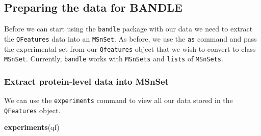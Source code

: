 \documentclass[9pt,a4paper,]{extarticle}
\newenvironment{Shaded}{\begin{snugshade}}{\end{snugshade}}
\newcommand{\FunctionTok}[1]{\textcolor[rgb]{0.13,0.29,0.53}{\textbf{#1}}}
\newcommand{\NormalTok}[1]{#1}
\begin{document}
\subsection{Preparing the data for BANDLE}\label{preparing-the-data-for-bandle}

Before we can start using the \texttt{bandle} package with our data we need to
extract the \texttt{QFeatures} data into an \texttt{MSnSet}. As before, we use the \texttt{as}
command and pass the experimental set from our \texttt{Qfeatures} object that
we wish to convert to class \texttt{MSnSet}. Currently, \texttt{bandle} works with \texttt{MSnSets}
and \texttt{lists} of \texttt{MSnSets}.

\subsubsection{Extract protein-level data into MSnSet}\label{extract-protein-level-data-into-msnset}

We can use the \texttt{experiments} command to view all our data stored in the
\texttt{QFeatures} object.

\begin{Shaded}
\begin{Highlighting}[]
\FunctionTok{experiments}\NormalTok{(qf)}
\end{Highlighting}
\end{Shaded}
\end{document}
